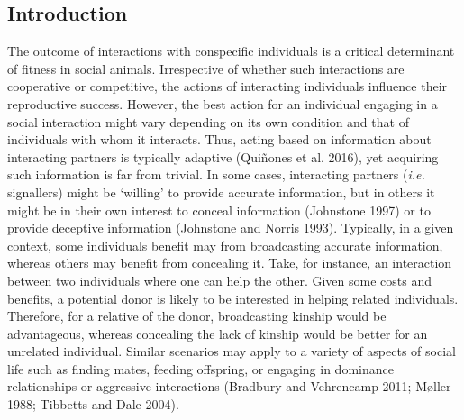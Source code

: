 \documentclass[
  12pt,
]{article}
\begin{document}
\newpage

\hypertarget{introduction}{%
\subsection{Introduction}\label{introduction}}

The outcome of interactions with conspecific individuals is a critical
determinant of fitness in social animals. Irrespective of whether such
interactions are cooperative or competitive, the actions of interacting
individuals influence their reproductive success. However, the best
action for an individual engaging in a social interaction might vary
depending on its own condition and that of individuals with whom it
interacts. Thus, acting based on information about interacting partners
is typically adaptive (Quiñones et al. 2016), yet acquiring such
information is far from trivial. In some cases, interacting partners
(\emph{i.e.} signallers) might be `willing' to provide accurate
information, but in others it might be in their own interest to conceal
information (Johnstone 1997) or to provide deceptive information
(Johnstone and Norris 1993). Typically, in a given context, some
individuals benefit may from broadcasting accurate information, whereas
others may benefit from concealing it. Take, for instance, an
interaction between two individuals where one can help the other. Given
some costs and benefits, a potential donor is likely to be interested in
helping related individuals. Therefore, for a relative of the donor,
broadcasting kinship would be advantageous, whereas concealing the lack
of kinship would be better for an unrelated individual. Similar
scenarios may apply to a variety of aspects of social life such as
finding mates, feeding offspring, or engaging in dominance relationships
or aggressive interactions (Bradbury and Vehrencamp 2011; Møller 1988;
Tibbetts and Dale 2004).
\end{document}
